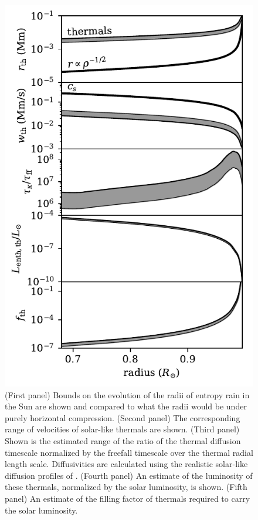 \begin{figure}[p!]
	\begin{center}
    \includegraphics[width=0.75\columnwidth]{./figs/thermal_sun_comparison.pdf}
	\end{center}
    \caption[Implications of thermal experiment results for solar convection and the entropy rain hypothesis]
	{
	(First panel) Bounds on the evolution of the radii of entropy rain in the Sun are shown and compared to what the radii would be under purely horizontal compression.
	(Second panel) The corresponding range of velocities of solar-like thermals are shown. 
	(Third panel) Shown is the estimated range of the ratio of the thermal diffusion timescale normalized by the freefall timescale over the thermal radial length scale.
	Diffusivities are calculated using the realistic solar-like diffusion profiles of \citet{brown2011}.
	(Fourth panel) An estimate of the luminosity of these thermals, normalized by the solar luminosity, is shown.
	(Fifth panel) An estimate of the filling factor of thermals required to carry the solar luminosity.
    \label{fig:thermal_sun_comparison} }
\end{figure}

